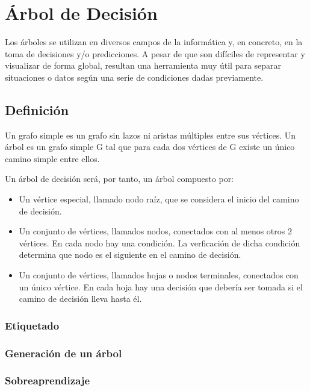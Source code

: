 \documentclass[12pt,a4paper]{article}
\begin{document}
	\newpage
	\section{\'Arbol de Decisi\'on}\label{sec:Decision_tree}
	
		Los \'arboles se utilizan en diversos campos de la inform\'atica y, en concreto, en la toma de decisiones y/o predicciones. A pesar de que son dif\'iciles de representar y visualizar de forma global, resultan una herramienta muy \'util para separar situaciones o datos seg\'un una serie de condiciones dadas previamente.
		
		\subsection{Definici\'on}
			Un grafo simple es un grafo sin lazos ni aristas m\'ultiples entre sus v\'ertices. Un \'arbol es un grafo simple G tal que
			para cada dos v\'ertices de G existe un \'unico camino simple entre ellos.
			
			Un \'arbol de decisi\'on ser\'a, por tanto, un \'arbol compuesto por:
			\begin{itemize}
				\item Un v\'ertice especial, llamado nodo ra\'iz, que se considera el inicio del camino de decisi\'on.
				\item Un conjunto de v\'ertices, llamados nodos, conectados con al menos otros 2 v\'ertices. En cada nodo hay una condici\'on. La verficaci\'on de dicha condici\'on determina que nodo es el siguiente en el camino de decisi\'on.
				\item Un conjunto de v\'ertices, llamados hojas o nodos terminales, conectados con un \'unico v\'ertice. En cada hoja hay una decisi\'on que deber\'ia ser tomada si el camino de decisi\'on lleva hasta \'el.
			\end{itemize}
			\subsubsection{Etiquetado}
			\subsubsection{Generaci\'on de un \'arbol}
			\subsubsection{Sobreaprendizaje}
	
	
	
		
\newpage



\end{document}
